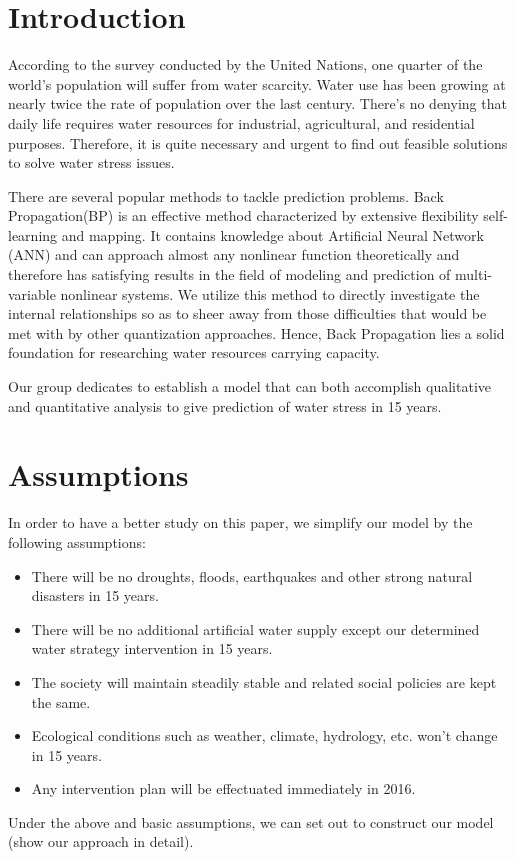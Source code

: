 
\section{Introduction}

According to the survey conducted by the United Nations, one quarter of the world's population will suffer from water scarcity. Water use has been growing at nearly twice the rate of population over the last century. There's no denying that daily life requires water resources for industrial, agricultural, and residential purposes. Therefore, it is quite necessary and urgent to find out feasible solutions to solve water stress issues.

There are several popular methods to tackle prediction problems. Back Propagation(BP)\cite{1} is an effective method characterized by extensive flexibility self-learning and mapping. It contains knowledge about Artificial Neural Network (ANN) and can approach almost any nonlinear function theoretically and therefore has satisfying results in the field of modeling and prediction of multi-variable nonlinear systems. We utilize this method to directly investigate the internal relationships so as to sheer away from those difficulties that would be met with by other quantization approaches. Hence, Back Propagation lies a solid foundation for researching water resources carrying capacity.

Our group dedicates to establish a model that can both accomplish qualitative and quantitative analysis to give prediction of water stress in 15 years.

\section{Assumptions}

 In order to have a better study on this paper, we simplify our model by the following assumptions:
\begin{itemize}
\item
There will be no droughts, floods, earthquakes and other strong natural disasters in 15 years.
\item
There will be no additional artificial water supply except our determined water strategy intervention in 15 years.
\item
The society will maintain steadily stable and related social policies are kept the same.
\item
Ecological conditions such as weather, climate, hydrology, etc. won't change in 15 years.
\item
Any intervention plan will be effectuated immediately in 2016.
\end{itemize}
Under the above and basic assumptions, we can set out to construct our model (show our approach in detail).

